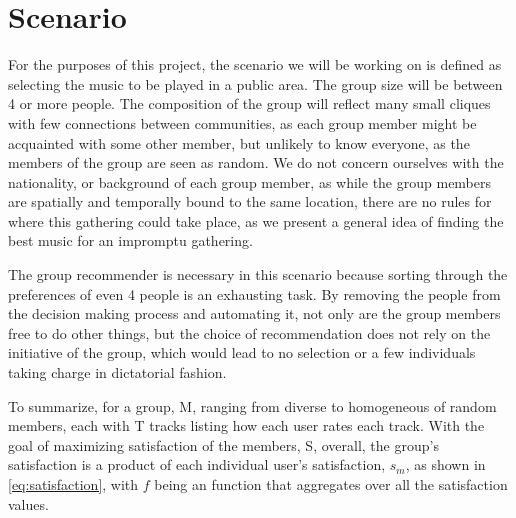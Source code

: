 \section{Scenario}

For the purposes of this project, the scenario we will be working on is defined as selecting the music to be played in a public area. The group size will be between 4 or more people. The composition of the group will reflect many small cliques with few connections between communities, as each group member might be acquainted with some other member, but unlikely to know everyone, as the members of the group are seen as random. We do not concern ourselves with the nationality, or background of each group member, as while the group members are spatially and temporally bound to the same location, there are no rules for where this gathering could take place, as we present a general idea of finding the best music for an impromptu gathering.

The group recommender is necessary in this scenario because sorting through the preferences of even 4 people is an exhausting task. By removing the people from the decision making process and automating it, not only are the group members free to do other things, but the choice of recommendation does not rely on the initiative of the group, which would lead to no selection or a few individuals taking charge in dictatorial fashion.

To summarize, for a group, M, ranging from diverse to homogeneous of random members, each with T tracks listing how each user rates each track.
With the goal of maximizing satisfaction of the members, S, overall, the group's satisfaction is a product of each individual user's satisfaction, $s_m$, as shown in \ref{eq:satisfaction}, with $f$ being an function that aggregates over all the satisfaction values.

